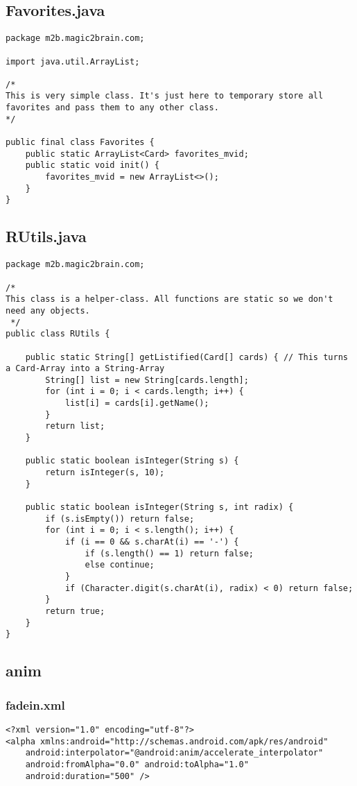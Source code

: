 \subsection*{Favorites.java}
\begin{lstlisting}
package m2b.magic2brain.com;

import java.util.ArrayList;

/*
This is very simple class. It's just here to temporary store all favorites and pass them to any other class.
*/

public final class Favorites {
    public static ArrayList<Card> favorites_mvid;
    public static void init() {
        favorites_mvid = new ArrayList<>();
    }
}
\end{lstlisting}
\newpage
\subsection*{RUtils.java}
\begin{lstlisting}
package m2b.magic2brain.com;

/*
This class is a helper-class. All functions are static so we don't need any objects.
 */
public class RUtils {

    public static String[] getListified(Card[] cards) { // This turns a Card-Array into a String-Array
        String[] list = new String[cards.length];
        for (int i = 0; i < cards.length; i++) {
            list[i] = cards[i].getName();
        }
        return list;
    }

    public static boolean isInteger(String s) {
        return isInteger(s, 10);
    }

    public static boolean isInteger(String s, int radix) {
        if (s.isEmpty()) return false;
        for (int i = 0; i < s.length(); i++) {
            if (i == 0 && s.charAt(i) == '-') {
                if (s.length() == 1) return false;
                else continue;
            }
            if (Character.digit(s.charAt(i), radix) < 0) return false;
        }
        return true;
    }
}
\end{lstlisting}
\newpage

\subsection*{anim}
\subsubsection*{fadein.xml}
\begin{lstlisting}
<?xml version="1.0" encoding="utf-8"?>
<alpha xmlns:android="http://schemas.android.com/apk/res/android"
    android:interpolator="@android:anim/accelerate_interpolator"
    android:fromAlpha="0.0" android:toAlpha="1.0"
    android:duration="500" />
\end{lstlisting}

